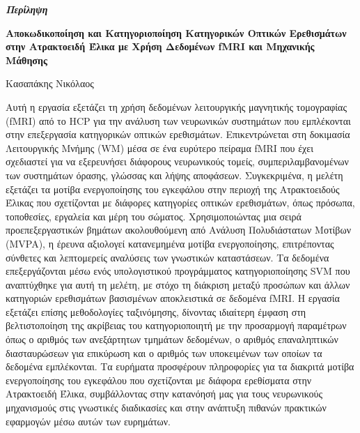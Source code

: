 \thispagestyle{plain}
\vspace*{\fill}
\begin{center}
    \LARGE
    \textit{\textbf{Περίληψη}}
        
    \vspace{0.4cm}
    \large
    \textbf{Αποκωδικοποίηση και Κατηγοριοποίηση Κατηγορικών Οπτικών Ερεθισμάτων στην Ατρακτοειδή Έλικα με Χρήση Δεδομένων fMRI και Μηχανικής Μάθησης}
        
    \vspace{0.4cm}
    Κασαπάκης Νικόλαος
\end{center}
\normalsize

\vspace{0.9cm}

Αυτή η εργασία εξετάζει τη χρήση δεδομένων λειτουργικής μαγνητικής τομογραφίας (\acrshort{fMRI}) από το \acrshort{HCP} για την ανάλυση των νευρωνικών συστημάτων που εμπλέκονται στην επεξεργασία κατηγορικών οπτικών ερεθισμάτων. Επικεντρώνεται στη δοκιμασία Λειτουργικής Μνήμης (\acrshort{WM}) μέσα σε ένα ευρύτερο πείραμα fMRI που έχει σχεδιαστεί για να εξερευνήσει διάφορους νευρωνικούς τομείς, συμπεριλαμβανομένων των συστημάτων όρασης, γλώσσας και λήψης αποφάσεων. Συγκεκριμένα, η μελέτη εξετάζει τα μοτίβα ενεργοποίησης του εγκεφάλου στην περιοχή της Ατρακτοειδούς Έλικας που σχετίζονται με διάφορες κατηγορίες οπτικών ερεθισμάτων, όπως πρόσωπα, τοποθεσίες, εργαλεία και μέρη του σώματος. Χρησιμοποιώντας μια σειρά προεπεξεργαστικών βημάτων ακολουθούμενη από Ανάλυση Πολυδιάστατων Μοτίβων (\acrshort{MVPA}), η έρευνα αξιολογεί κατανεμημένα μοτίβα ενεργοποίησης, επιτρέποντας σύνθετες και λεπτομερείς αναλύσεις των γνωστικών καταστάσεων. Τα δεδομένα επεξεργάζονται μέσω ενός υπολογιστικού προγράμματος κατηγοριοποίησης \acrshort{SVM} που αναπτύχθηκε για αυτή τη μελέτη, με στόχο τη διάκριση μεταξύ προσώπων και άλλων κατηγοριών ερεθισμάτων βασισμένων αποκλειστικά σε δεδομένα \acrshort{fMRI}. Η εργασία εξετάζει επίσης μεθοδολογίες ταξινόμησης, δίνο\-ντας ιδιαίτερη έμφαση στη βελτιστοποίηση της ακρίβειας του κατηγοριοποιητή με την προσα\-ρμογή παραμέτρων όπως ο αριθμός των ανεξάρτητων τμημάτων δεδομένων, ο αριθμός επανα\-ληπτικών διασταυρώσεων για επικύρωση και ο αριθμός των υποκειμένων των οποίων τα δεδομένα εμπλέκονται. Τα ευρήματα προσφέρουν πληροφορίες για τα διακριτά μοτίβα ενεργο\-ποίησης του εγκεφάλου που σχετίζονται με διάφορα ερεθίσματα στην Ατρακτοειδή Έλικα, συμβάλλοντας στην κατανόησή μας για τους νευρωνικούς μηχανισμούς στις γνωστικές διαδικα\-σίες και στην ανάπτυξη πιθανών πρακτικών εφαρμογών μέσω αυτών των ευρημάτων.

\vspace*{\fill}

